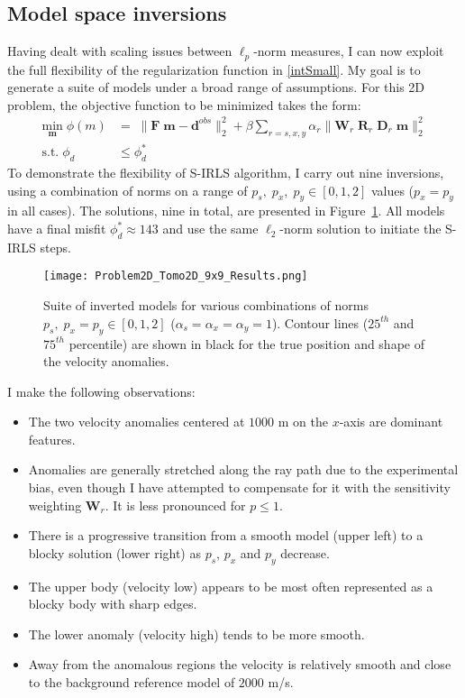 \subsection{Model space inversions}
Having dealt with scaling issues between $\ell_p$-norm measures, I can now exploit the full flexibility of the regularization function in \eqref{intSmall}.
My goal is to generate a suite of models under a broad range of assumptions.
For this 2D problem, the objective function to be minimized takes the form:
\begin{equation}\label{ObjFun2D}
\begin{split}
\underset{\mathbf{m}}{\text{min}}\; \phi(m) & = \; \|\mathbf{F}\;\mathbf{m} - \mathbf{d}^{obs}\|_2^2 + \beta \sum_{r=s,x,y} \alpha_r \|\mathbf{W}_r \;\mathbf{R}_r\;\mathbf{D}_r \;\mathbf{m}\|_2^2 \\
\text{s.t.} \; \phi_d & \leq \phi_d^* \;
\end{split}
\end{equation}
To demonstrate the flexibility of S-IRLS algorithm, I carry out nine inversions, using a combination of norms on a range of $p_s,\; p_{x},\;p_y \in {[0,1,2]}$ values ($p_x=p_y$ in all cases). The solutions, nine in total, are presented in Figure~\ref{Mixed2DSolutions}. All models have a final misfit $\phi_d^* \approx 143$ and use the same $\ell_2$-norm solution to initiate the S-IRLS steps.
\begin{figure}
\texttt{[image: Problem2D\_Tomo2D\_9x9\_Results.png]}
\caption{Suite of inverted models for various combinations of norms $p_s,\; p_{x}=p_{y} \in {[0,1,2]}$ ($\alpha_s=\alpha_x=\alpha_y=1$). Contour lines ($25^{th}$ and $75^{th}$ percentile) are shown in black for the true position and shape of the velocity anomalies.}
\label{Mixed2DSolutions}
\end{figure}
I make the following observations:
\begin{itemize}
\item The two velocity anomalies centered at $1000$ m on the $x$-axis are dominant features.
\item Anomalies are generally stretched along the ray path due to the experimental bias, even though I have attempted to compensate for it with the sensitivity weighting $\mathbf{W}_r$. It is less pronounced for $p\leq1$.
\item There is a progressive transition from a smooth model (upper left) to a blocky solution (lower right) as $p_s$, $p_{x}$ and $p_y$ decrease.
\item The upper body (velocity low) appears to be most often represented as a blocky body with sharp edges.
\item The lower anomaly (velocity high) tends to be more smooth.
\item Away from the anomalous regions the velocity is relatively smooth and close to the background reference model of $2000$ m/s.
\end{itemize}

